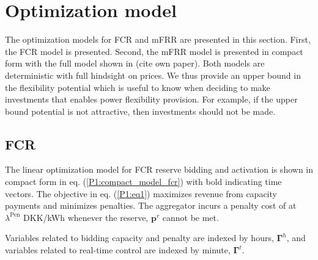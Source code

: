 \documentclass[lettersize,journal]{IEEEtran}
\begin{document}
\section{Optimization model}

The optimization models for FCR and mFRR are presented in this section. First, the FCR model is presented. Second, the mFRR model is presented in compact form with the full model shown in (cite own paper). Both models are deterministic with full hindsight on prices. We thus provide an upper bound in the flexibility potential which is useful to know when deciding to make investments that enables power flexibility provision. For example, if the upper bound potential is not attractive, then investments should not be made.

\subsection{FCR}

The linear optimization model for FCR reserve bidding and activation is shown in compact form in eq. (\ref{P1:compact_model_fcr}) with bold indicating time vectors. The objective in eq. (\ref{P1:eq1}) maximizes revenue from capacity payments and minimizes penalties. The aggregator incurs a penalty cost of at $\lambda^{\text{Pen}}$ DKK/kWh whenever the reserve, $\bm{p}^{r}$ cannot be met.

Variables related to bidding capacity and penalty are indexed by hours, $\bm{\Gamma}^{h}$, and variables related to real-time control are indexed by minute, $\bm{\Gamma}^{t}$.
\end{document}
